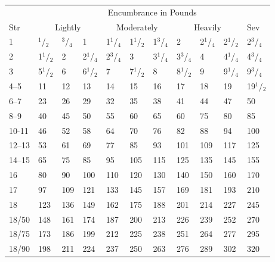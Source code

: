 \noindent
\begin{minipage}{\columnwidth}

\label{encbipeds}
\noindent
\begin{tabular}{|p{}|p{}|p{}|p{}|p{}|p{}|p{}|p{}|p{}|p{}|p{}|}
\hline
 & \multicolumn{10}{c|}{Encumbrance in Pounds} \\
Str	& \multicolumn{3}{c|}{Lightly}	& \multicolumn{3}{c|}{Moderately}	& \multicolumn{3}{c|}{Heavily}	& Sev \\
\hline\hline
\rowcolor[gray]{.9}1		& $^1$/$_2$ 	& $^3$/$_4$		& 1		& 1$^1$/$_4$ 	& 1$^1$/$_2$ 	& 1$^3$/$_4$	& 2		& 2$^1$/$_4$ 	& 2$^1$/$_2$  	& 2$^3$/$_4$  \\
2		& 1$^1$/$_2$ 	& 2		& 2$^1$/$_4$ 	& 2$^3$/$_4$ 	& 3		& 3$^1$/$_4$ 	& 3$^3$/$_4$ 	& 4		& 4$^1$/$_4$  	& 4$^3$/$_4$  \\
\rowcolor[gray]{.9}3		& 5$^1$/$_2$ 	& 6		& 6$^1$/$_2$ 	& 7		& 7$^1$/$_2$ 	& 8		& 8$^1$/$_2$ 	& 9		& 9$^1$/$_4$		& 9$^3$/$_4$  \\
4--5		& 11	& 12	& 13	& 14	& 15	& 16	& 17	& 18	& 19	& 19$^1$/$_2$  \\
\rowcolor[gray]{.9}6--7		& 23	& 26	& 29	& 32	& 35	& 38	& 41	& 44	& 47	& 50 \\
8--9		& 40	& 45	& 50	& 55	& 60	& 65	& 60	& 75	& 80	& 85 \\
\rowcolor[gray]{.9}10-11	& 46	& 52	& 58	& 64	& 70	& 76	& 82	& 88	& 94	& 100 \\
12--13	& 53	& 61	& 69	& 77	& 85	& 93	& 101	& 109	& 117	& 125 \\
\rowcolor[gray]{.9}14--15	& 65	& 75	& 85	& 95	& 105	& 115	& 125	& 135	& 145	& 155 \\
16		& 80	& 90	& 100	& 110	& 120	& 130	& 140	& 150	& 160	& 170 \\
\rowcolor[gray]{.9}17		& 97	& 109	& 121	& 133	& 145	& 157	& 169	& 181	& 193	& 210 \\
18		& 123	& 136	& 149	& 162	& 175	& 188	& 201	& 214	& 227	& 245 \\
\rowcolor[gray]{.9}18/50	& 148	& 161	& 174	& 187	& 200	& 213	& 226	& 239	& 252	& 270 \\
18/75	& 173	& 186	& 199	& 212	& 225	& 238	& 251	& 264	& 277	& 295 \\
\rowcolor[gray]{.9}18/90	& 198	& 211	& 224	& 237	& 250	& 263	& 276	& 289	& 302	& 320 \\

\end{tabular}
\end{minipage}
